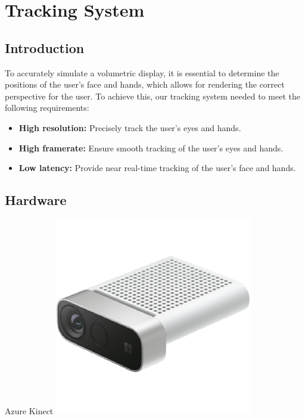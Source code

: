 \section{Tracking System}

\subsection{Introduction}

To accurately simulate a volumetric display, it is essential to determine the positions of the user's face and hands, which allows for rendering the correct perspective for the user. To achieve this, our tracking system needed to meet the following requirements:

\begin{itemize}[itemsep=-0.25em]
	\item \textbf{High resolution:} Precisely track the user's eyes and hands.
	\item \textbf{High framerate:} Ensure smooth tracking of the user's eyes and hands.
	\item \textbf{Low latency:} Provide near real-time tracking of the user's face and hands.
\end{itemize}

\subsection{Hardware}

\begin{figureBox}[label={fig:kinect}, width=0.4\linewidth]{Azure Kinect \cite{noauthor_buy_nodate}}
    \includegraphics[width=0.9\linewidth]{./implementation/figures/kinect.pdf}
\end{figureBox}

